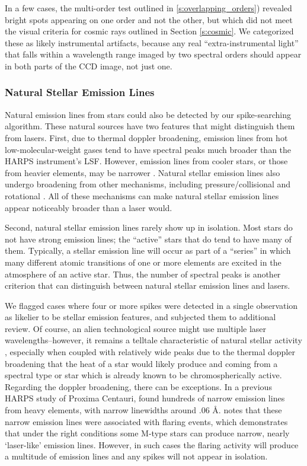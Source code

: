 \documentclass[twocolumn]{aastex701}
\begin{document}
In a few cases, the multi-order test outlined in \ref{s:overlapping_orders}) revealed bright spots appearing on one order and not the other, but which did not meet the visual criteria for cosmic rays outlined in Section \ref{s:cosmic}.  We categorized these as likely instrumental artifacts, because any real “extra-instrumental light” that falls within a wavelength range imaged by two spectral orders should appear in both parts of the CCD image, not just one.

\subsubsection{Natural Stellar Emission Lines}
\label{s:stellaremission}
Natural emission lines from stars could also be detected by our spike-searching algorithm.  These natural sources have two features that might distinguish them from lasers. First, due to thermal doppler broadening, emission lines from hot low-molecular-weight gases tend to have spectral peaks much broader than the HARPS instrument's LSF. However, emission lines from cooler stars, or those from heavier elements, may be narrower \citep{Livadiotis_2018}. Natural stellar emission lines also undergo broadening from other mechanisms, including pressure/collisional \citep{Peach2006} and rotational \citep{Rotational_Broadening}. All of these mechanisms can make natural stellar emission lines appear noticeably broader than a laser would. 
 
Second, natural stellar emission lines rarely show up in isolation. Most stars do not have strong emission lines; the \enquote{active} stars that do tend to have many of them. Typically, a stellar emission line will occur as part of a “series” in which many different atomic transitions of one or more elements are excited in the atmosphere of an active star.  Thus, the number of spectral peaks is another criterion that can distinguish between natural stellar emission lines and lasers. 

We flagged cases where four or more spikes were detected in a single observation as likelier to be stellar emission features, and subjected them to additional review. Of course, an alien technological source might use multiple laser wavelengths--however, it remains a telltale characteristic of natural stellar activity \citep{Livadiotis_2018}, especially when coupled with relatively wide peaks due to the thermal doppler broadening that the heat of a star would likely produce and coming from a spectral type or star which is already known to be chromospherically active. Regarding the doppler broadening, there can be exceptions. In a previous HARPS study of Proxima Centauri, \citep{ProximaCentauri} found hundreds of narrow emission lines from heavy elements, with narrow linewidths around .06 \AA. \cite{ProximaCentauri} notes that these narrow emission lines were associated with flaring events, which demonstrates that under the right conditions some M-type stars can produce narrow, nearly `laser-like' emission lines. However, in such cases the flaring activity will produce a multitude of emission lines and any spikes will not appear in isolation.
\end{document}
